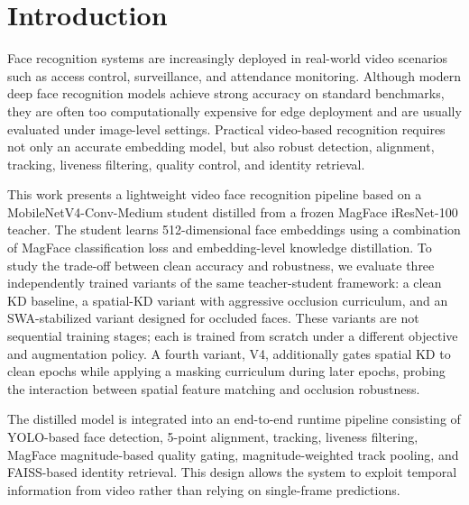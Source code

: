 \section{Introduction}
Face recognition systems are increasingly deployed in real-world video scenarios such as access control, surveillance, and attendance monitoring. Although modern deep face recognition models achieve strong accuracy on standard benchmarks, they are often too computationally expensive for edge deployment and are usually evaluated under image-level settings. Practical video-based recognition requires not only an accurate embedding model, but also robust detection, alignment, tracking, liveness filtering, quality control, and identity retrieval.

This work presents a lightweight video face recognition pipeline based on a MobileNetV4-Conv-Medium student distilled from a frozen MagFace iResNet-100 teacher\cite{magface}. The student learns 512-dimensional face embeddings using a combination of MagFace classification loss and embedding-level knowledge distillation\cite{relationalkd,hinton2015distilling}. To study the trade-off between clean accuracy and robustness, we evaluate three independently trained variants of the same teacher-student framework: a clean KD baseline, a spatial-KD variant with aggressive occlusion curriculum, and an SWA-stabilized variant designed for occluded faces\cite{izmailov2019averagingweightsleadswider}. These variants are not sequential training stages; each is trained from scratch under a different objective and augmentation policy. A fourth variant, V4, additionally gates spatial KD to clean epochs while applying a masking curriculum during later epochs, probing the interaction between spatial feature matching and occlusion robustness.

The distilled model is integrated into an end-to-end runtime pipeline consisting of YOLO-based face detection, 5-point alignment, tracking, liveness filtering, MagFace magnitude-based quality gating, magnitude-weighted track pooling, and FAISS-based identity retrieval\cite{faiss,yolo1,yolo11_ultralytics}. This design allows the system to exploit temporal information from video rather than relying on single-frame predictions.

